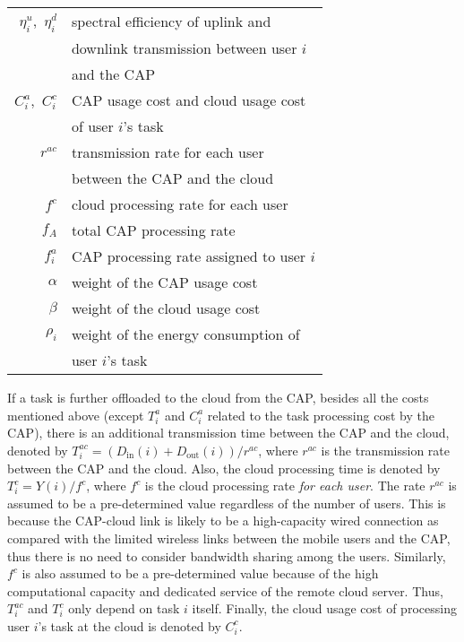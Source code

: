 \documentclass[10pt,journal,compsoc]{IEEEtran}
\begin{document}
\begin{table}[t]
\begin{tabular}{|r| l|}
$\eta_i^u$,\ $\eta_i^d$ & spectral efficiency of uplink and \\
         &  downlink transmission between user $i$ \\
        & and the CAP\\
$C^a_{i}$,\ $C^c_{i}$ & CAP usage cost and cloud usage cost\\
        & of user $i$'s task\\
$r^{ac}$ & transmission rate for each user \\
        & between the CAP and the cloud\\
$f^{c}$ & cloud processing rate for each user\\
$f_A$ &  total CAP processing rate\\
$f^a_i$ & CAP processing rate assigned to user $i$\\
$\alpha$ & weight of the CAP usage cost\\
$\beta$ & weight of the cloud usage cost\\
$\rho_i$ & weight of the energy consumption of \\
         &user $i$'s task\\
 \hline
\end{tabular}
\label{table_notation}
\end{table}

If a task is further offloaded to the cloud from the CAP, besides
all the costs mentioned above (except $T^a_{i}$ and $C^a_{i}$
related to the task processing cost by the CAP), there is an
additional transmission time between the CAP and the cloud, denoted
by $T^{ac}_{i}=(D_{{\textrm{in}}}(i)+D_{{\textrm{out}}}(i))/r^{ac}$,
where
 $r^{ac}$ is the transmission
rate between the CAP and the cloud. Also, the cloud processing time
is denoted by $T^{c}_{i}=Y(i)/f^{c}$, where $f^c$ is the cloud
processing rate \textit{for each user}. The rate $r^{ac}$ is assumed
to be a pre-determined value regardless of the number of users. This
is because the CAP-cloud link is likely to be a high-capacity wired
connection as compared
 with the limited wireless links between the mobile users
and the CAP, thus there is no need to consider bandwidth sharing
among the users. Similarly, $f^c$ is also assumed to be a
pre-determined value because of the high computational capacity and
dedicated service of the remote cloud server. Thus, $T^{ac}_{i}$ and
$T^{c}_{i}$ only depend on task $i$ itself. Finally, the cloud usage
cost of processing user $i$'s task at the cloud is denoted by
$C^c_{i}$.
\end{document}
